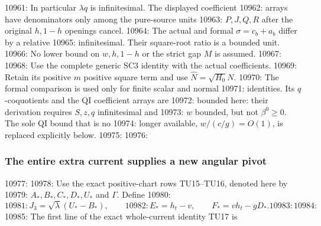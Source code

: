 10961: In particular $\lambda q$ is infinitesimal. The displayed coefficient
10962: arrays have denominators only among the pure-source units
10963: $P,J,Q,R$ after the original $h,1-h$ openings cancel.
10964: The actual and formal $\sigma=c_b+a_b$ differ by a relative
10965: infinitesimal. Their square-root ratio is a bounded unit.
10966: No lower bound on $w,h,1-h$ or the strict gap $M$ is assumed.
10967: 
10968: Use the complete generic SC3 identity with the actual coefficients.
10969: Retain its positive $m$ positive square term and use $\widehat N=\sqrt{H_0}N$.
10970: The formal comparison is used only for finite scalar and normal
10971: identities. Its $q$-coquotients and the QI coefficient arrays are
10972: bounded here: their derivation requires $S,z,q$ infinitesimal and
10973: $w$ bounded, but not $\beta^0\geq0$. The sole QI bound that is no
10974: longer available, $w/(c/g)=O(1)$, is replaced explicitly below.
10975: 
10976: \subsubsection*{The entire extra current supplies a new angular pivot}
10977: 
10978: Use the exact positive-chart rows TU15--TU16, denoted here by
10979: $A_*,B_*,C_*,D_*,U_*$ and $\Gamma$. Define
10980: \[
10981:  J_3=\sqrt\lambda(U_*-B_*),\qquad
10982:  E_*=h_t-v,\qquad F_*=vh_t-gD_*.
10983:                                                                \tag{UL4}
10984: \]
10985: The first line of the exact whole-current identity TU17 is
